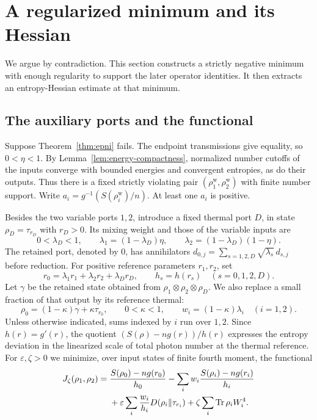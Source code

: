 \section{A regularized minimum and its Hessian}\label{sec:minimization}

We argue by contradiction. This section constructs a strictly negative
minimum with enough regularity to support the later operator identities.
It then extracts an entropy-Hessian estimate at that minimum.

\subsection{The auxiliary ports and the functional}

Suppose Theorem~\ref{thm:epni} fails. The endpoint transmissions give
equality, so $0<\eta<1$. By Lemma~\ref{lem:energy-compactness}, normalized
number cutoffs of the inputs converge with bounded energies and convergent
entropies, as do their outputs. Thus there is a fixed strictly violating
pair $(\rho_1^{\mathrm{w}},\rho_2^{\mathrm{w}})$ with finite number support.
Write $a_i=g^{-1}(S(\rho_i^{\mathrm{w}})/n)$. At least one $a_i$ is positive.

Besides the two variable ports $1,2$, introduce a fixed thermal port
$D$, in state $\rho_D=\tau_{r_D}$ with $r_D>0$. Its mixing weight and those
of the variable inputs are
\[
 0<\lambda_D<1,\qquad
 \lambda_1=(1-\lambda_D)\eta,\qquad
 \lambda_2=(1-\lambda_D)(1-\eta).
\]
The retained port, denoted by $0$, has annihilators
$d_{0,j}=\sum_{s=1,2,D}\sqrt{\lambda_s}\,d_{s,j}$ before reduction.
For positive reference parameters $r_1,r_2$, set
\[
 r_0=\lambda_1r_1+\lambda_2r_2+\lambda_Dr_D,
 \qquad h_s=h(r_s)\quad(s=0,1,2,D).
\]
Let $\gamma$ be the retained state obtained from
$\rho_1\otimes\rho_2\otimes\rho_D$. We also replace a small fraction of
that output by its reference thermal:
\[
 \rho_0=(1-\kappa)\gamma+\kappa\tau_{r_0},\qquad
 0<\kappa<1,\qquad w_i=(1-\kappa)\lambda_i\quad(i=1,2).
\]
Unless otherwise indicated, sums indexed by $i$ run over $1,2$.
Since $h(r)=g'(r)$, the quotient $(S(\rho)-ng(r))/h(r)$ expresses the
entropy deviation in the linearized scale of total photon number at the
thermal reference.
For $\varepsilon,\zeta>0$ we minimize, over input states of finite fourth
moment, the functional
\begin{equation}\label{eq:functional}
 \begin{split}
 J_\zeta(\rho_1,\rho_2)
 ={}&\frac{S(\rho_0)-ng(r_0)}{h_0}
 -\sum_i w_i\frac{S(\rho_i)-ng(r_i)}{h_i}\\
 &+\varepsilon\sum_i\frac{w_i}{h_i}
      D(\rho_i\Vert\tau_{r_i})
 +\zeta\sum_i\operatorname{Tr}\rho_iW_i^4.
 \end{split}
\end{equation}

